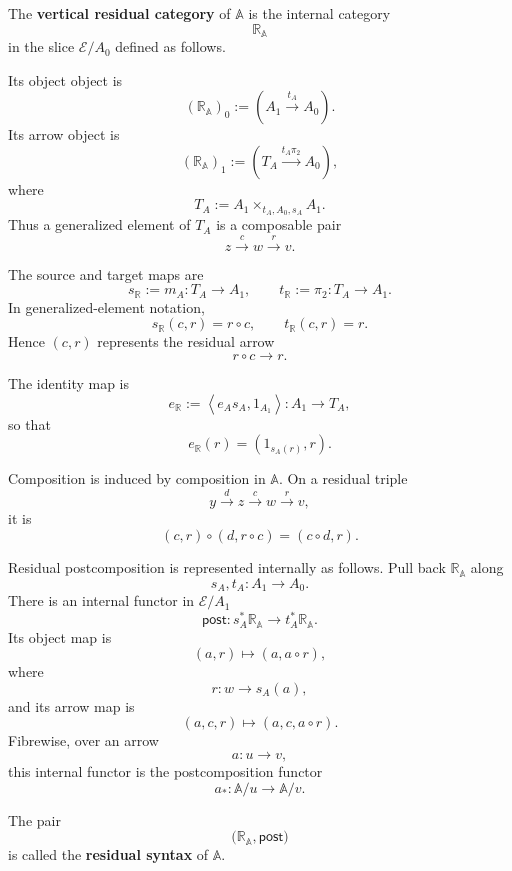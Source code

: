 \begin{definition}
\label{def:residual-syntax}
    The \textbf{vertical residual category} of \(\mathbb A\) is the internal
    category
    \[
        \mathbb R_{\mathbb A}
    \]
    in the slice \(\mathcal E/A_0\) defined as follows.

    Its object object is
    \[
        (\mathbb R_{\mathbb A})_0
        :=
        \left(
            A_1\xrightarrow{t_A}A_0
        \right).
    \]
    Its arrow object is
    \[
        (\mathbb R_{\mathbb A})_1
        :=
        \left(
            T_A\xrightarrow{t_A\pi_2}A_0
        \right),
    \]
    where
    \[
        T_A
        :=
        A_1\times_{t_A,A_0,s_A}A_1.
    \]
    Thus a generalized element of \(T_A\) is a composable pair
    \[
        z\xrightarrow{c}w\xrightarrow{r}v.
    \]

    The source and target maps are
    \[
        s_{\mathbb R}
        :=
        m_A:T_A\to A_1,
        \qquad
        t_{\mathbb R}
        :=
        \pi_2:T_A\to A_1.
    \]
    In generalized-element notation,
    \[
        s_{\mathbb R}(c,r)=r\circ c,
        \qquad
        t_{\mathbb R}(c,r)=r.
    \]
    Hence \((c,r)\) represents the residual arrow
    \[
        r\circ c\longrightarrow r.
    \]

    The identity map is
    \[
        e_{\mathbb R}
        :=
        \left\langle
            e_As_A,
            1_{A_1}
        \right\rangle:
        A_1\to T_A,
    \]
    so that
    \[
        e_{\mathbb R}(r)=(1_{s_A(r)},r).
    \]

    Composition is induced by composition in \(\mathbb A\). On a residual
    triple
    \[
        y\xrightarrow{d}z\xrightarrow{c}w\xrightarrow{r}v,
    \]
    it is
    \[
        (c,r)\circ(d,r\circ c)
        =
        (c\circ d,r).
    \]

    Residual postcomposition is represented internally as follows. Pull back
    \(\mathbb R_{\mathbb A}\) along
    \[
        s_A,t_A:A_1\to A_0.
    \]
    There is an internal functor in \(\mathcal E/A_1\)
    \[
        \mathsf{post}:
        s_A^*\mathbb R_{\mathbb A}
        \longrightarrow
        t_A^*\mathbb R_{\mathbb A}.
    \]
    Its object map is
    \[
        (a,r)\longmapsto(a,a\circ r),
    \]
    where
    \[
        r:w\to s_A(a),
    \]
    and its arrow map is
    \[
        (a,c,r)\longmapsto(a,c,a\circ r).
    \]
    Fibrewise, over an arrow
    \[
        a:u\to v,
    \]
    this internal functor is the postcomposition functor
    \[
        a_*:\mathbb A/u\to\mathbb A/v.
    \]

    The pair
    \[
        \bigl(
            \mathbb R_{\mathbb A},
            \mathsf{post}
        \bigr)
    \]
    is called the \textbf{residual syntax} of \(\mathbb A\).
\end{definition}

